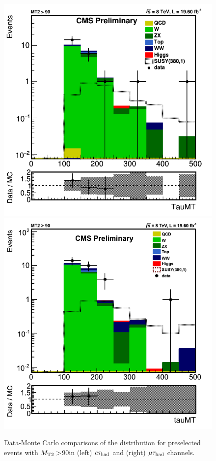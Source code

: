 \begin{figure}[!Hhtb]
\centering
\includegraphics[angle=0,scale=0.35]{SelectionEleTau/TauMT.png}
\includegraphics[angle=0,scale=0.35]{SelectionMuTau/tauMT_Ratio_MT2gt90_unBlinded.png}
\caption{Data-Monte Carlo comparisons of the \tauMT distribution for
preselected events
with ${M_{\rm T2}}>$90\GeV in (left) $e\tau_{\rm had}$ and (right) $\mu\tau_{\rm had}$ channels.}
\label{fig:taumtleptontau}
\end{figure}

